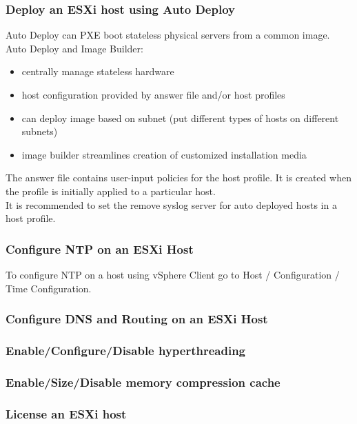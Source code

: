 \subsubsection{Deploy an ESXi host using Auto Deploy}

Auto Deploy can PXE boot stateless physical servers from a common image.\\

Auto Deploy and Image Builder:

\begin{itemize}
\item centrally manage stateless hardware
\item host configuration provided by answer file and/or host profiles
\item can deploy image based on subnet (put different types of hosts on
different subnets)
\item image builder streamlines creation of customized installation media
\end{itemize}

The answer file contains user-input policies for the host profile. It is
created when the profile is initially applied to a particular host.\\

It is recommended to set the remove syslog server for auto deployed hosts
in a host profile.

\subsubsection{Configure NTP on an ESXi Host}

To configure NTP on a host using vSphere Client go to Host / Configuration /
Time Configuration.

\subsubsection{Configure DNS and Routing on an ESXi Host}

\subsubsection{Enable/Configure/Disable hyperthreading}

\subsubsection{Enable/Size/Disable memory compression cache}

\subsubsection{License an ESXi host}
